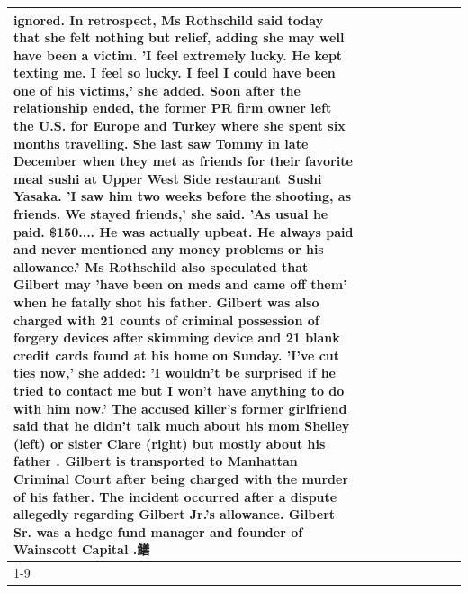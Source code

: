 \begin{table}[H]
\begin{tabular}{lllrlllll}
ignored. In retrospect, Ms Rothschild said today that she felt nothing but relief, adding she may well have been a victim. 'I feel extremely lucky. He kept texting me. I feel so lucky. I feel I could have been one of his victims,' she added. Soon after the relationship ended, the former PR firm owner left the U.S. for Europe and Turkey where she spent six months  travelling. She last saw Tommy in late December when they met as friends for their favorite meal sushi at Upper West Side restaurant Sushi Yasaka. 'I saw him two weeks before the shooting, as friends. We stayed friends,' she said. 'As usual he paid. \$150.... He was actually upbeat. He always paid and never mentioned any money problems or his allowance.' Ms Rothschild also speculated that Gilbert may 'have been on meds and came off them' when he fatally shot his father. Gilbert was also charged with 21 counts of criminal possession of forgery devices after skimming device and 21 blank credit cards found at his home on Sunday. 'I've cut ties now,' she added: 'I wouldn’t be surprised if he tried to contact me but I won’t have anything to do with him now.' The accused killer's former girlfriend said that he didn't talk much about his mom Shelley (left) or sister Clare (right) but mostly about his father . Gilbert is transported to Manhattan Criminal Court  after being charged with the murder of his father. The incident occurred after a dispute allegedly regarding Gilbert Jr.'s allowance. Gilbert Sr. was a hedge fund manager and founder of Wainscott Capital .鳝 \\
\cline{1-9} \cline{2-9}

\end{tabular}
\end{table}
